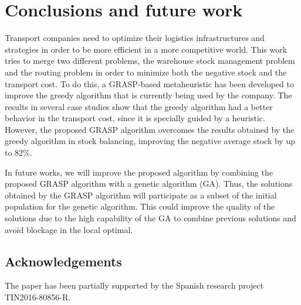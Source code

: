 \documentclass[letterpaper]{article} %
\begin{document}
\section*{Conclusions and future work}


Transport companies need to optimize their logistics infrastructures and strategies in order to be more efficient in a more competitive world. This work tries to merge two different problems, the warehouse stock management problem and the routing problem in order to minimize both the negative stock and the transport cost. To do this, a GRASP-based metaheuristic has been developed to improve the greedy algorithm that is currently being used by the company. The results in several case studies show that the greedy algorithm had a better behavior in the transport cost, since it is specially guided by a heuristic. However, the proposed GRASP algorithm overcomes the results obtained by the greedy algorithm in stock balancing, improving the negative average stock by up to 82\%.

In future works, we will improve the proposed algorithm by combining the proposed GRASP algorithm with a genetic algorithm (GA). Thus, the solutions obtained by the GRASP algorithm will participate as a subset of the initial population for the genetic algorithm. This could improve the quality of the solutions due to the high capability of the GA to combine previous solutions and avoid blockage in the local optimal.


\subsection*{Acknowledgements}
The paper has been partially supported by the Spanish research project TIN2016-80856-R.



\end{document}
